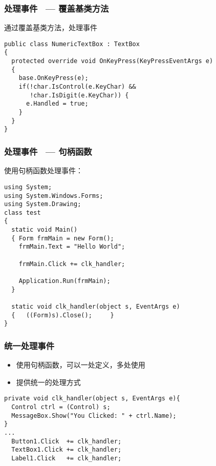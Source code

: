 \begin{frame}[fragile]
\frametitle{处理事件~ --- 覆盖基类方法}
通过覆盖基类方法，处理事件
\begin{lstlisting}
public class NumericTextBox : TextBox
{
  protected override void OnKeyPress(KeyPressEventArgs e)
  {
    base.OnKeyPress(e);
    if(!char.IsControl(e.KeyChar) && 
       !char.IsDigit(e.KeyChar)) {
      e.Handled = true;
    }
  }
}
\end{lstlisting}
\end{frame}

\begin{frame}[fragile]
\frametitle{处理事件~ --- 句柄函数}
使用句柄函数处理事件：
\begin{lstlisting}
using System;
using System.Windows.Forms;
using System.Drawing;
class test
{ 
  static void Main()
  { Form frmMain = new Form();
    frmMain.Text = "Hello World";

    frmMain.Click += clk_handler;

    Application.Run(frmMain);
  }

  static void clk_handler(object s, EventArgs e)
  {   ((Form)s).Close();     }
}
\end{lstlisting}
\end{frame}

\begin{frame}[fragile]
\frametitle{统一处理事件}
\begin{itemize}
\item 使用句柄函数，可以一处定义，多处使用
\item 提供统一的处理方式
\end{itemize}
\begin{lstlisting}
private void clk_handler(object s, EventArgs e){
  Control ctrl = (Control) s;
  MessageBox.Show("You Clicked: " + ctrl.Name);
}
...
  Button1.Click  += clk_handler;
  TextBox1.Click += clk_handler;
  Label1.Click   += clk_handler;
\end{lstlisting}
\end{frame}


